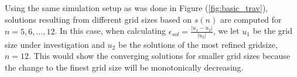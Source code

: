 

  

  Using the same simulation setup as was done in Figure (\ref{fig:basic_trav}), solutions resulting from different grid sizes based on $s(n)$ are computed for $n = 5, 6, \ldots, 12$.
  In this case, when calculating $\epsilon_{sol} = \frac{| u_1 - u_2 |}{|u_2|}$, we let $u_1$ be the grid size under investigation and $u_2$ be the solutions of the most refined gridsize, $n = 12$.
  This would show the converging solutions for smaller grid sizes because the change to the finest grid size will be monotonically decreasing.

